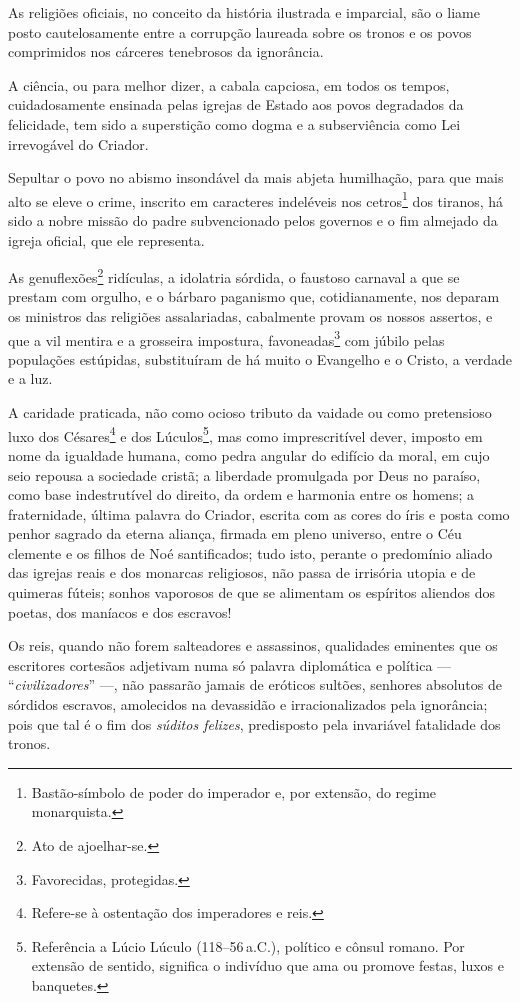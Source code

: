 As religiões oficiais, no conceito da história ilustrada e imparcial,
são o liame posto cautelosamente entre a corrupção laureada sobre os
tronos e os povos comprimidos nos cárceres tenebrosos da ignorância.

A ciência, ou para melhor dizer, a cabala capciosa, em todos os tempos,
cuidadosamente ensinada pelas igrejas de Estado aos povos degradados da
felicidade, tem sido a superstição como dogma e a subserviência como Lei
irrevogável do Criador.

Sepultar o povo no abismo insondável da mais abjeta humilhação, para que
mais alto se eleve o crime, inscrito em caracteres indeléveis nos
cetros\footnote{Bastão-símbolo de poder do imperador e, por extensão,
  do regime monarquista.} dos tiranos, há sido a nobre missão do padre
subvencionado pelos governos e o fim almejado da igreja oficial, que ele
representa.

As genuflexões\footnote{Ato de ajoelhar-se.} ridículas, a idolatria
sórdida, o faustoso carnaval a que se prestam com orgulho, e o bárbaro
paganismo que, cotidianamente, nos deparam os ministros das religiões
assalariadas, cabalmente provam os nossos assertos, e que a vil mentira
e a grosseira impostura, favoneadas\footnote{Favorecidas, protegidas.}
com júbilo pelas populações estúpidas, substituíram de há muito o
Evangelho e o Cristo, a verdade e a luz.

A caridade praticada, não como ocioso tributo da vaidade ou como
pretensioso luxo dos Césares\footnote{Refere-se à ostentação dos
  imperadores e reis.} e dos Lúculos\footnote{Referência a Lúcio
  Lúculo (118--56\,a.C.), político e cônsul romano. Por extensão de
  sentido, significa o indivíduo que ama ou promove festas, luxos e
  banquetes.}, mas como imprescritível dever, imposto em nome da
igualdade humana, como pedra angular do edifício da moral, em cujo seio
repousa a sociedade cristã; a liberdade promulgada por Deus no paraíso,
como base indestrutível do direito, da ordem e harmonia entre os homens;
a fraternidade, última palavra do Criador, escrita com as cores do íris
e posta como penhor sagrado da eterna aliança, firmada em pleno
universo, entre o Céu clemente e os filhos de Noé santificados; tudo
isto, perante o predomínio aliado das igrejas reais e dos monarcas
religiosos, não passa de irrisória utopia e de quimeras fúteis; sonhos
vaporosos de que se alimentam os espíritos aliendos dos poetas, dos
maníacos e dos escravos!

Os reis, quando não forem salteadores e assassinos, qualidades eminentes
que os escritores cortesãos adjetivam numa só palavra diplomática e
política --- ``\emph{civilizadores}'' ---, não passarão jamais de eróticos
sultões, senhores absolutos de sórdidos escravos, amolecidos na
devassidão e irracionalizados pela ignorância; pois que tal é o fim dos
\emph{súditos felizes}, predisposto pela invariável fatalidade dos
tronos.

